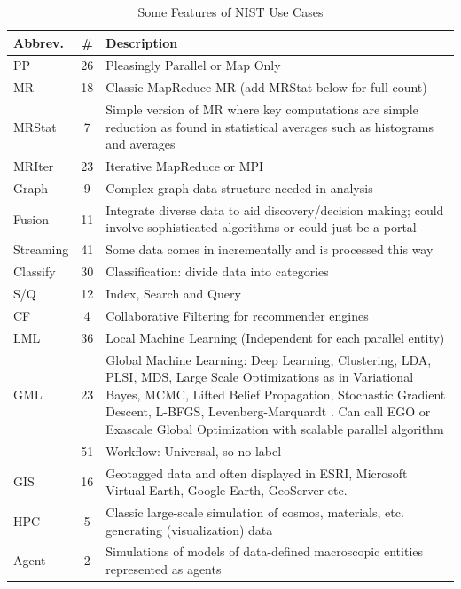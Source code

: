 \documentclass{acm_proc_article-sp}
\begin{document}
\begin{table}[t]
\centering
\caption{Some Features of NIST Use Cases}
\label{Table2}
\begin{tabular}{|p{1.5cm}|c|p{5.75cm}|} \hline
\textbf{Abbrev. } & \textbf{\#} & \textbf{Description} \\ \hline
PP & 26 & Pleasingly Parallel or Map Only \\ \hline
MR & 18 & Classic MapReduce MR (add MRStat below for full count) \\ \hline
MRStat & 7 & Simple version of MR where key computations are simple reduction as found in statistical averages such as histograms and averages  \\ \hline
MRIter & 23 & Iterative MapReduce or MPI \\ \hline
Graph & 9 & Complex graph data structure needed in analysis \\ \hline
Fusion & 11 & Integrate diverse data to aid discovery/decision making; could involve sophisticated algorithms or could just be a portal \\ \hline
Streaming & 41 &Some data comes in incrementally and is processed this way \\ \hline
Classify & 30 & Classification: divide data into categories \\ \hline
S/Q & 12 & Index, Search and Query \\ \hline
CF & 4 & Collaborative Filtering for recommender engines \\ \hline
LML & 36 & Local Machine Learning (Independent for each parallel entity) \\ \hline
GML & 23 & Global Machine Learning: Deep Learning, Clustering, LDA, PLSI, MDS, Large Scale Optimizations as in Variational Bayes, MCMC, Lifted Belief Propagation, Stochastic Gradient Descent, L-BFGS, Levenberg-Marquardt . Can call EGO or Exascale Global Optimization with scalable parallel algorithm \\ \hline
    & 51 &Workflow: Universal, so no label \\ \hline
GIS & 16 & Geotagged data and often displayed in ESRI, Microsoft Virtual Earth, Google Earth, GeoServer etc. \\ \hline
HPC & 5 & Classic large-scale simulation of cosmos, materials, etc. generating (visualization) data \\ \hline
Agent & 2 & Simulations of models of data-defined macroscopic entities represented as agents \\
\hline\end{tabular}
\end{table}
\end{document}
